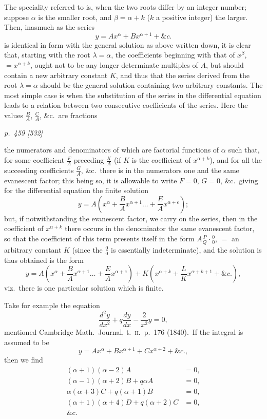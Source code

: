 \documentclass[11pt,a4paper]{article}
\theoremstyle{plain}
\theoremstyle{definition}
\begin{document}
The speciality referred to is, when the two roots differ by an integer number;
suppose $\alpha$ is the smaller root, and $\beta=\alpha+k$ ($k$ a positive integer) the larger. Then,
inasmuch as the series
\[
y=Ax^\alpha+Bx^{\alpha+1}+\&c.
\]
is identical in form with the general solution as above written down, it is clear that,
starting with the root $\lambda=\alpha$, the coefficients beginning with that of $x^\beta$, $=x^{\alpha+k}$, ought
not to be any longer determinate multiples of $A$, but should contain a new arbitrary
constant $K$, and thus that the series derived from the root $\lambda=\alpha$ should be the
general solution containing two arbitrary constants. The most simple case is when
the substitution of the series in the differential equation leads to a relation between
two consecutive coefficients of the series. Here the values $\frac BA$, $\frac CA$, \&c.\ are fractions

\clearpage

\bigskip
\textit{p.~459 [532]}
\smallskip

the numerators and denominators of which are factorial functions of $\alpha$ such that, for
some coefficient $\frac FA$ preceding $\frac KA$ (if $K$ is the coefficient of $x^{\alpha+k}$), and for all the
succeeding coefficients $\frac GA$, \&c.\ there is in the numerators one and the same evanescent
factor; this being so, it is allowable to write $F=0$, $G=0$, \&c.\ giving for the
differential equation the finite solution
\[
y=A\left(x^\alpha+\frac BAx^{\alpha+1}\ldots+\frac EAx^{\alpha+e}\right);
\]
but, if notwithstanding the evanescent factor, we carry on the series, then in the
coefficient of $x^{\alpha+k}$ there occurs in the denominator the same evanescent factor, so
that the coefficient of this term presents itself in the form $A\frac PQ\cdot\frac00$, $=$ an arbitrary
constant $K$ (since the $\frac00$ is essentially indeterminate), and the solution is thus
obtained is the form
\[
y=A\left(x^\alpha+\frac BAx^{\alpha+1}\ldots+\frac EAx^{\alpha+e}\right)
+K\left(x^{\alpha+k}+\frac LKx^{\alpha+k+1}+\&c.\right),
\]
viz.\ there is one particular solution which is finite.

Take for example the equation
\[
\frac{d^2y}{dx^2}+q\frac{dy}{dx}-\frac{2}{x^2}y=0 \tag{I},
\]
mentioned Cambridge Math.\ Journal, t.~\textsc{ii.}\ p.~176 (1840).\ If the integral is assumed to
be
\[
y = Ax^\alpha + Bx^{\alpha+1} + Cx^{\alpha+2} + \&c.,
\]
then we find
\begin{align*}
(\alpha+1)(\alpha-2)A&=0,\\
(\alpha-1)(\alpha+2)B+q\alpha A&=0,\\
\alpha(\alpha+3)C+q(\alpha+1)B&=0,\\
(\alpha+1)(\alpha+4)D+q(\alpha+2)C&=0,\\
\&c.
\end{align*}
\end{document}
